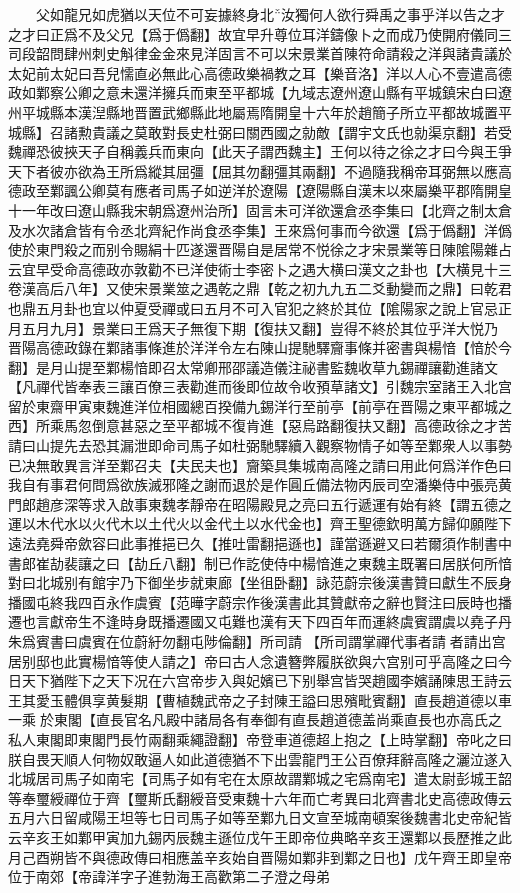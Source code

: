 　　父如龍兄如虎猶以天位不可妄據終身北汝獨何人欲行舜禹之事乎洋以告之才之才曰正爲不及父兄【爲于僞翻】故宜早升尊位耳洋鑄像卜之而成乃使開府儀同三司段韶問肆州刺史斛律金金來見洋固言不可以宋景業首陳符命請殺之洋與諸貴議於太妃前太妃曰吾兒懦直必無此心高德政樂禍教之耳【樂音洛】洋以人心不壹遣高德政如鄴察公卿之意未還洋擁兵而東至平都城【九域志遼州遼山縣有平城鎮宋白曰遼州平城縣本漢湼縣地晋置武鄉縣此地屬焉隋開皇十六年於趙簡子所立平都故城置平城縣】召諸勲貴議之莫敢對長史杜弼曰關西國之勍敵【謂宇文氏也勍渠京翻】若受魏禪恐彼挾天子自稱義兵而東向【此天子謂西魏主】王何以待之徐之才曰今與王爭天下者彼亦欲為王所爲縱其屈彊【屈其勿翻彊其兩翻】不過隨我稱帝耳弼無以應高德政至鄴諷公卿莫有應者司馬子如逆洋於遼陽【遼陽縣自漢末以來屬樂平郡隋開皇十一年改曰遼山縣我宋朝爲遼州治所】固言未可洋欲還倉丞李集曰【北齊之制太倉及水次諸倉皆有令丞北齊紀作尚食丞李集】王來爲何事而今欲還【爲于僞翻】洋僞使於東門殺之而别令賜絹十匹遂還晋陽自是居常不悦徐之才宋景業等日陳隂陽雜占云宜早受命高德政亦敦勸不已洋使術士李密卜之遇大横曰漢文之卦也【大横見十三卷漢高后八年】又使宋景業筮之遇乾之鼎【乾之初九九五二爻動變而之鼎】曰乾君也鼎五月卦也宜以仲夏受禪或曰五月不可入官犯之終於其位【隂陽家之說上官忌正月五月九月】景業曰王爲天子無復下期【復扶又翻】豈得不終於其位乎洋大悦乃晋陽高德政錄在鄴諸事條進於洋洋令左右陳山提馳驛齎事條并密書與楊愔【愔於今翻】是月山提至鄴楊愔即召太常卿邢邵議造儀注祕書監魏收草九錫禪讓勸進諸文【凡禪代皆奉表三讓百僚三表勸進而後即位故令收預草諸文】引魏宗室諸王入北宫留於東齋甲寅東魏進洋位相國總百揆備九錫洋行至前亭【前亭在晋陽之東平都城之西】所乘馬忽倒意甚惡之至平都城不復肯進【惡烏路翻復扶又翻】高德政徐之才苦請曰山提先去恐其漏泄即命司馬子如杜弼馳驛續入觀察物情子如等至鄴衆人以事勢已决無敢異言洋至鄴召夫【夫民夫也】齎築具集城南高隆之請曰用此何爲洋作色曰我自有事君何問爲欲族滅邪隆之謝而退於是作圓丘備法物丙辰司空潘樂侍中張亮黄門郎趙彦深等求入啟事東魏孝靜帝在昭陽殿見之亮曰五行遞運有始有終【謂五德之運以木代水以火代木以土代火以金代土以水代金也】齊王聖德欽明萬方歸仰願陛下遠法堯舜帝歛容曰此事推挹已久【推吐雷翻挹遜也】謹當遜避又曰若爾須作制書中書郎崔劼裴讓之曰【劼丘八翻】制已作訖使侍中楊愔進之東魏主既署曰居朕何所愔對曰北城别有館宇乃下御坐步就東廊【坐徂卧翻】詠范蔚宗後漢書贊曰獻生不辰身播國屯終我四百永作虞賓【范曄字蔚宗作後漢書此其贊獻帝之辭也賢注曰辰時也播遷也言獻帝生不逢時身既播遷國又屯難也漢有天下四百年而運終虞賓謂虞以堯子丹朱爲賓書曰虞賓在位蔚紆勿翻屯陟倫翻】所司請【所司謂掌禪代事者請者請出宫居别邸也此實楊愔等使人請之】帝曰古人念遺簪弊履朕欲與六宫别可乎高隆之曰今日天下猶陛下之天下况在六宫帝步入與妃嬪已下别舉宫皆哭趙國李嬪誦陳思王詩云王其愛玉體俱享黄髮期【曹植魏武帝之子封陳王謚曰思殯毗賓翻】直長趙道德以車一乘於東閣【直長官名凡殿中諸局各有奉御有直長趙道德盖尚乘直長也亦高氏之私人東閣即東閣門長竹兩翻乘繩證翻】帝登車道德超上抱之【上時掌翻】帝叱之曰朕自畏天順人何物奴敢逼人如此道德猶不下出雲龍門王公百僚拜辭高隆之灑泣遂入北城居司馬子如南宅【司馬子如有宅在太原故謂鄴城之宅爲南宅】遣太尉彭城王韶等奉璽綬禪位于齊【璽斯氏翻綬音受東魏十六年而亡考異曰北齊書北史高德政傳云五月六日留咸陽王坦等七日司馬子如等至鄴九日文宣至城南頓案後魏書北史帝紀皆云辛亥王如鄴甲寅加九錫丙辰魏主遜位戊午王即帝位典略辛亥王還鄴以長歷推之此月己酉朔皆不與德政傳曰相應盖辛亥始自晋陽如鄴非到鄴之日也】戊午齊王即皇帝位于南郊【帝諱洋字子進勃海王高歡第二子澄之母弟
